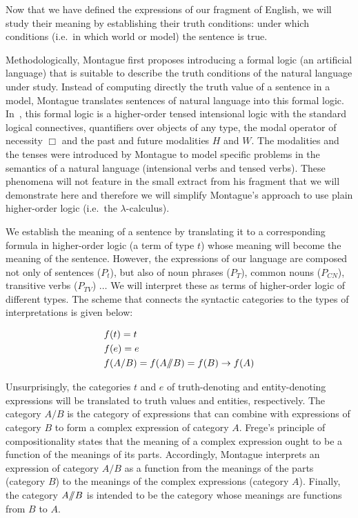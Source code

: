 Now that we have defined the expressions of our fragment of English, we
will study their meaning by establishing their truth conditions: under
which conditions (i.e.\ in which world or model) the sentence is true.

Methodologically, Montague first proposes introducing a formal logic (an
artificial language) that is suitable to describe the truth conditions of
the natural language under study. Instead of computing directly the truth
value of a sentence in a model, Montague translates sentences of natural
language into this formal logic. In~\cite{montague1973proper}, this formal
logic is a higher-order tensed intensional logic with the standard logical
connectives, quantifiers over objects of any type, the modal operator of
necessity $\Box$ and the past and future modalities $H$ and $W$. The
modalities and the tenses were introduced by Montague to model specific
problems in the semantics of a natural language (intensional verbs and
tensed verbs). These phenomena will not feature in the small extract from
his fragment that we will demonstrate here and therefore we will simplify
Montague's approach to use plain higher-order logic (i.e.\ the
$\lambda$-calculus).

We establish the meaning of a sentence by translating it to a corresponding
formula in higher-order logic (a term of type $t$) whose meaning will
become the meaning of the sentence. However, the expressions of our
language are composed not only of sentences ($P_t$), but also of noun
phrases ($P_T$), common nouns ($P_{CN}$), transitive verbs ($P_{TV}$)
$\ldots$ We will interpret these as terms of higher-order logic of
different types. The scheme that connects the syntactic categories to the
types of interpretations is given below:

\begin{align*}
  &f(t) = t \\
  &f(e) = e \\
  &f(A / B) = f(A /\!\!/ B) = f(B) \to f(A)
\end{align*}

Unsurprisingly, the categories $t$ and $e$ of truth-denoting and
entity-denoting expressions will be translated to truth values and
entities, respectively. The category $A / B$ is the category of expressions
that can combine with expressions of category $B$ to form a complex
expression of category $A$. Frege's principle of compositionality states
that the meaning of a complex expression ought to be a function of the
meanings of its parts. Accordingly, Montague interprets an expression of
category $A / B$ as a function from the meanings of the parts (category
$B$) to the meanings of the complex expressions (category $A$). Finally,
the category $A /\!\!/ B$ is intended to be the category whose
meanings are functions from $B$ to $A$.

